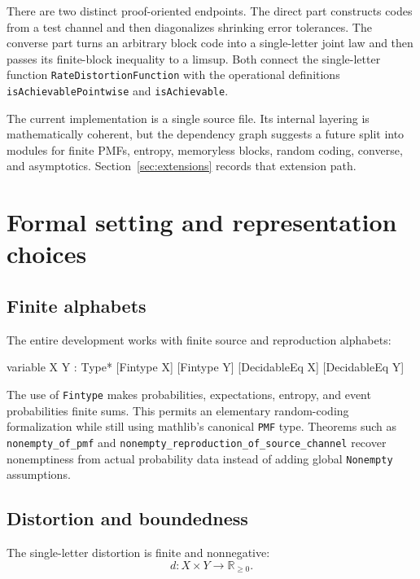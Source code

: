 \documentclass[11pt]{article}
\begin{document}
There are two distinct proof-oriented endpoints.  The direct part constructs
codes from a test channel and then diagonalizes shrinking error tolerances.  The
converse part turns an arbitrary block code into a single-letter joint law and
then passes its finite-block inequality to a limsup. Both connect the
single-letter function \texttt{Rate\allowbreak Distortion\allowbreak Function} with the operational
definitions \texttt{is\allowbreak Achievable\allowbreak Pointwise} and \texttt{is\allowbreak Achievable}.

The current implementation is a single source file.  Its internal layering is
mathematically coherent, but the dependency graph suggests a future split into
modules for finite PMFs, entropy, memoryless blocks, random coding, converse,
and asymptotics.  Section~\ref{sec:extensions} records that extension path.

\section{Formal setting and representation choices}

\subsection{Finite alphabets}

The entire development works with finite source and reproduction alphabets:

\begin{LeanCode}
variable {X Y : Type*}
  [Fintype X] [Fintype Y] [DecidableEq X] [DecidableEq Y]
\end{LeanCode}

The use of \texttt{Fintype} makes probabilities, expectations, entropy, and
event probabilities finite sums.  This permits an elementary random-coding
formalization while still using mathlib's canonical \texttt{PMF} type.
Theorems such as \texttt{nonempty\_\allowbreak of\_\allowbreak pmf} and
\texttt{nonempty\_\allowbreak reproduction\_\allowbreak of\_\allowbreak source\_\allowbreak channel} recover nonemptiness from
actual probability data instead of adding global \texttt{Nonempty} assumptions.

\subsection{Distortion and boundedness}

The single-letter distortion is finite and nonnegative:
\[
  d:X\times Y\longrightarrow \mathbb{R}_{\ge 0}.
\]
\end{document}
